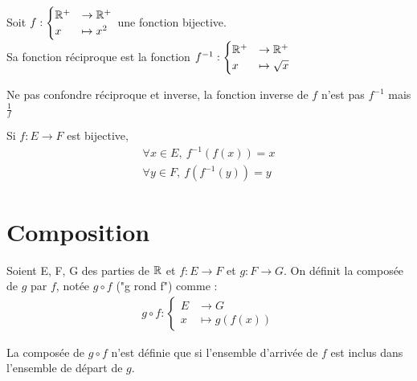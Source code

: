 \begin{exemple}~
	\\
	Soit 
	$
	f : 
	\begin{cases}
		\mathbb{R}^+ &\to \mathbb{R}^+ \\
		x &\mapsto x^2
	\end{cases}
	$
	une fonction bijective. 
	\\
	Sa fonction réciproque est la fonction
	$
	f^{-1} :
	\begin{cases}
		\mathbb{R}^+ &\to \mathbb{R}^+ \\
		x &\mapsto \sqrt{x}
	\end{cases}
	$
\end{exemple}

\begin{remarque}
	Ne pas confondre réciproque et inverse, la fonction inverse de $f$ n'est pas $f^{-1}$ mais $\frac{1}{f}$
\end{remarque}

\begin{graybox}
	\begin{proposition}
		Si $f : E \to F$ est bijective, 
		\begin{align*}
			\forall x \in E,\ f^{-1}(f(x)) = x \\
			\forall y \in F,\ f(f^{-1}(y)) = y
		\end{align*}
	\end{proposition}
\end{graybox}


\section{Composition}

\begin{graybox}
	\begin{definition}
		Soient E, F, G des parties de $\mathbb{R}$ et $f: E \to F$ et $g: F \to G$.
		On définit la composée de $g$ par $f$, notée $g \circ f$ ("g rond f") comme :
		\begin{align*}
			g \circ f :
			\begin{cases}
				E &\to G \\
				x &\mapsto g(f(x))
			\end{cases}
		\end{align*}
	\end{definition}  
\end{graybox}  


\begin{remarque}
	La composée de $g \circ f$ n'est définie que si l'ensemble d'arrivée de $f$ est inclus dans l'ensemble de départ de $g$.
\end{remarque}

